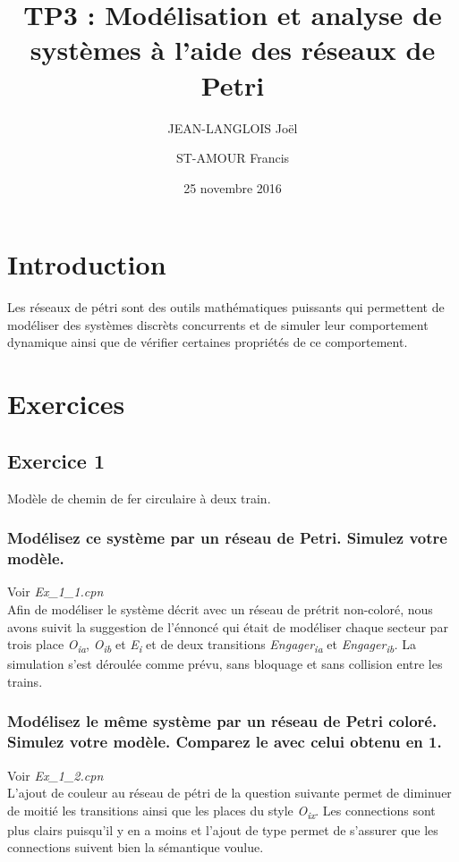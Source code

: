 \documentclass[french]{article}
\title{TP3 : Modélisation et analyse de systèmes à l'aide des réseaux de Petri}
\author{
  JEAN-LANGLOIS Joël
  \and
  ST-AMOUR Francis
}
\date{25 novembre 2016}
\begin{document}
\maketitle

\section{Introduction}

Les réseaux de pétri sont des outils mathématiques puissants qui permettent de modéliser des systèmes discrèts concurrents et de simuler leur comportement dynamique ainsi que de vérifier certaines propriétés de ce comportement.

\section{Exercices}

\subsection{Exercice 1}
Modèle de chemin de fer circulaire à deux train.

\subsubsection{Modélisez ce système par un réseau de Petri. Simulez votre modèle.}
Voir \textit{Ex\_1\_1.cpn} \\

Afin de modéliser le système décrit avec un réseau de prétrit non-coloré, nous avons suivit la suggestion de l'énnoncé qui était de modéliser chaque secteur par trois place \textit{O\textsubscript{ia}}, \textit{O\textsubscript{ib}} et \textit{E\textsubscript{i}} et de deux transitions \textit{Engager\textsubscript{ia}} et \textit{Engager\textsubscript{ib}.}  La simulation s'est déroulée comme prévu, sans bloquage et sans collision entre les trains.
\subsubsection{Modélisez le même système par un réseau de Petri coloré. Simulez votre modèle. Comparez le avec celui obtenu
  en 1.}
Voir \textit{Ex\_1\_2.cpn} \\

L'ajout de couleur au réseau de pétri de la question suivante permet de diminuer de moitié les transitions ainsi que les places du style \textit{O\textsubscript{ix}}. Les connections sont plus clairs puisqu'il y en a moins et l'ajout de type permet de s'assurer que les connections suivent bien la sémantique voulue.
\end{document}
